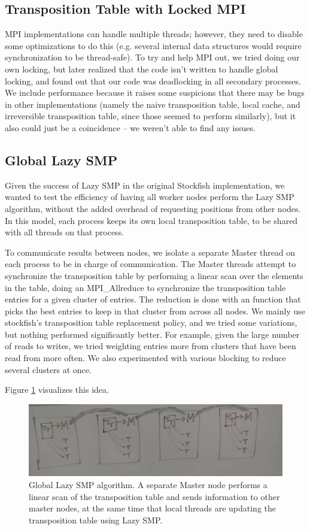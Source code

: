 \documentclass{article}
\begin{document}
\subsection{Transposition Table with Locked MPI}
MPI implementations can handle multiple threads; however, they need to disable
some optimizations to do this (e.g. several internal data structures would
require synchronization to be thread-safe). To try and help MPI out, we tried
doing our own locking, but later realized that the code isn't written to handle
global locking, and found out that our code was deadlocking in all secondary
processes. We include performance because it raises some suspicions that there
may be bugs in other implementations (namely the naive transposition table,
local cache, and irreversible transposition table, since those seemed to perform
similarly), but it also could just be a coincidence -- we weren't able to find
any issues.

\subsection{Global Lazy SMP}
Given the success of Lazy SMP in the original Stockfish implementation, we
wanted to test the efficiency of having all worker nodes perform the Lazy SMP
algorithm, without the added overhead of requesting positions from other nodes.
In this model, each process keeps its own local transposition table, to be
shared with all threads on that process.

To communicate results between nodes,
we isolate a separate Master thread on each process to be in charge of
communication. The Master threads attempt to synchronize the transposition table
by performing a linear scan over the elements in the table, doing an
{MPI\_Allreduce} to synchronize the transposition table entries for a given
cluster of entries. The reduction is done with an function that picks the best
entries to keep in that cluster from across all nodes. We mainly use
stockfish's transposition table replacement policy, and we tried some
variations, but nothing performed significantly better. For example, given the
large number of reads to writes, we tried weighting entries more from clusters
that have been read from more often. We also experimented with various blocking
to reduce several clusters at once.

Figure \ref{fig:diagram}
visualizes this idea.

\begin{figure}[t]
	\includegraphics[width=\textwidth]{diagram}
	\caption{Global Lazy SMP algorithm. A separate Master node performs a
	linear scan of the transposition table and sends information to other
	master nodes, at the same time that local threads are updating the
	transposition table using Lazy SMP.}
	\label{fig:diagram}
\end{figure}
\end{document}
